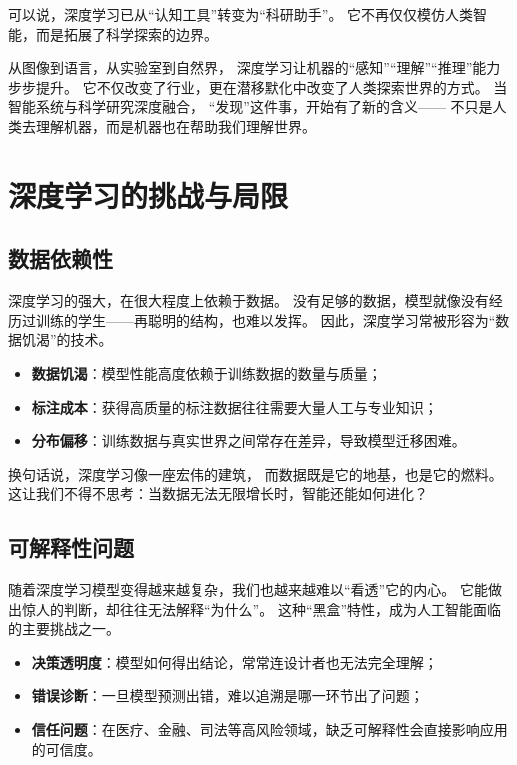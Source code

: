 可以说，深度学习已从“认知工具”转变为“科研助手”。  
它不再仅仅模仿人类智能，而是拓展了科学探索的边界。

从图像到语言，从实验室到自然界，  
深度学习让机器的“感知”“理解”“推理”能力步步提升。  
它不仅改变了行业，更在潜移默化中改变了人类探索世界的方式。  
当智能系统与科学研究深度融合，  
“发现”这件事，开始有了新的含义——  
不只是人类去理解机器，而是机器也在帮助我们理解世界。

\section{深度学习的挑战与局限}

\subsection{数据依赖性}

深度学习的强大，在很大程度上依赖于数据。  
没有足够的数据，模型就像没有经历过训练的学生——再聪明的结构，也难以发挥。  
因此，深度学习常被形容为“数据饥渴”的技术。

\begin{itemize}
\item \textbf{数据饥渴}：模型性能高度依赖于训练数据的数量与质量；
\item \textbf{标注成本}：获得高质量的标注数据往往需要大量人工与专业知识；
\item \textbf{分布偏移}：训练数据与真实世界之间常存在差异，导致模型迁移困难。
\end{itemize}

换句话说，深度学习像一座宏伟的建筑，  
而数据既是它的地基，也是它的燃料。  
这让我们不得不思考：当数据无法无限增长时，智能还能如何进化？

\subsection{可解释性问题}

随着深度学习模型变得越来越复杂，我们也越来越难以“看透”它的内心。  
它能做出惊人的判断，却往往无法解释“为什么”。  
这种“黑盒”特性，成为人工智能面临的主要挑战之一。

\begin{itemize}
\item \textbf{决策透明度}：模型如何得出结论，常常连设计者也无法完全理解；
\item \textbf{错误诊断}：一旦模型预测出错，难以追溯是哪一环节出了问题；
\item \textbf{信任问题}：在医疗、金融、司法等高风险领域，缺乏可解释性会直接影响应用的可信度。
\end{itemize}

